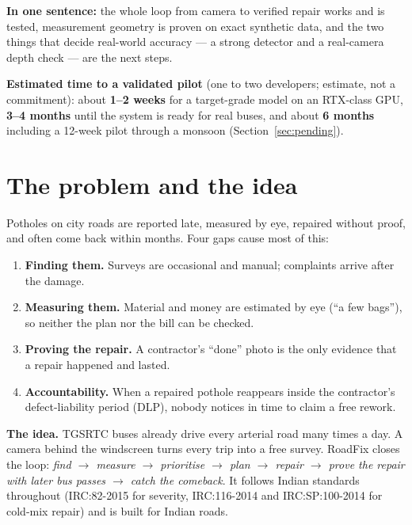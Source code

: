 \documentclass[11pt,a4paper]{article}
\begin{document}
\textbf{In one sentence:} the whole loop from camera to verified repair works and is tested, measurement geometry is
proven on exact synthetic data, and the two things that decide real-world accuracy --- a strong detector and a
real-camera depth check --- are the next steps.

\textbf{Estimated time to a validated pilot} (one to two developers; estimate, not a commitment): about
\textbf{1--2 weeks} for a target-grade model on an RTX-class GPU, \textbf{3--4 months} until the system is ready for
real buses, and about \textbf{6 months} including a 12-week pilot through a monsoon (Section~\ref{sec:pending}).

\section{The problem and the idea}\label{sec:problem}

Potholes on city roads are reported late, measured by eye, repaired without proof, and often come back within
months. Four gaps cause most of this:
\begin{enumerate}
  \item \textbf{Finding them.} Surveys are occasional and manual; complaints arrive after the damage.
  \item \textbf{Measuring them.} Material and money are estimated by eye (``a few bags''), so neither the plan nor the
        bill can be checked.
  \item \textbf{Proving the repair.} A contractor's ``done'' photo is the only evidence that a repair happened and
        lasted.
  \item \textbf{Accountability.} When a repaired pothole reappears inside the contractor's defect-liability period
        (DLP), nobody notices in time to claim a free rework.
\end{enumerate}

\textbf{The idea.} TGSRTC buses already drive every arterial road many times a day. A camera behind the windscreen
turns every trip into a free survey. RoadFix closes the loop:
\emph{find $\rightarrow$ measure $\rightarrow$ prioritise $\rightarrow$ plan $\rightarrow$ repair $\rightarrow$ prove
the repair with later bus passes $\rightarrow$ catch the comeback}. It follows Indian standards throughout
(IRC:82-2015 for severity, IRC:116-2014 and IRC:SP:100-2014 for cold-mix repair) and is built for Indian roads.
\end{document}
